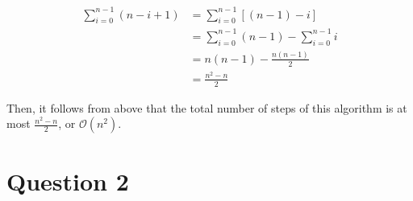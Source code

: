 \documentclass[12pt]{article}
\begin{document}
\begin{enumerate}[a.]
\begin{tcolorbox}
        \begin{align}
            \sum\limits_{i=0}^{n-1} (n - i + 1) &= \sum\limits_{i=0}^{n-1} \left[ (n-1) - i \right]\\
            &= \sum\limits_{i=0}^{n-1} (n-1) - \sum\limits_{i=0}^{n-1} i\\
            &= n(n-1) - \frac{n(n-1)}{2}\\
            &= \frac{n^2-n}{2}
        \end{align}

        \bigskip

        Then, it follows from above that the total number of steps of this
        algorithm is at most $\frac{n^2-n}{2}$, or $\mathcal{O}(n^2)$.
    \end{tcolorbox}

\end{enumerate}

\section*{Question 2}
\end{document}
